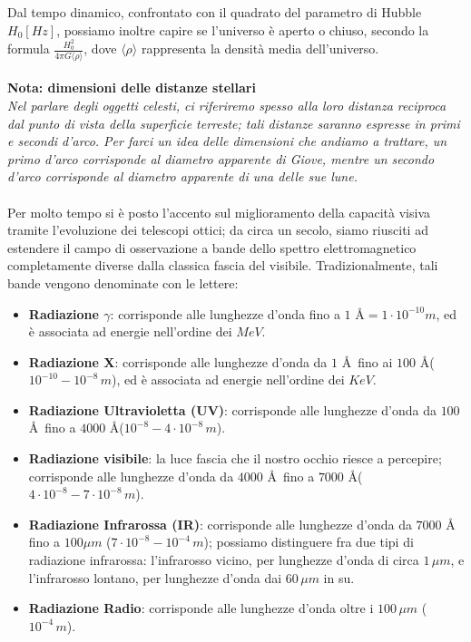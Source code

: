 Dal tempo dinamico, confrontato con il quadrato del parametro di Hubble $H_0 \left[Hz \right]$, possiamo inoltre capire se l'universo è aperto o chiuso, secondo la formula $\frac{H_0 ^2}{4 \pi G \langle \rho \rangle}$, dove $\langle \rho \rangle$ rappresenta la densità media dell'universo.
\\
\\
\textbf{Nota: dimensioni delle distanze stellari}\\
\textit{Nel parlare degli oggetti celesti, ci riferiremo spesso alla loro distanza reciproca dal punto di vista della superficie terreste; tali distanze saranno espresse in primi e secondi d'arco. Per farci un idea delle dimensioni che andiamo a trattare, un primo d'arco corrisponde al diametro apparente di Giove, mentre un secondo d'arco corrisponde al diametro apparente di una delle sue lune.}
\\
\\
Per molto tempo si è posto l'accento sul miglioramento della capacità visiva tramite l'evoluzione dei telescopi ottici; da circa un secolo, siamo riusciti ad estendere il campo di osservazione a bande dello spettro elettromagnetico completamente diverse dalla classica fascia del visibile. Tradizionalmente, tali bande vengono denominate con le lettere:
\begin{itemize}
	\item \textbf{Radiazione $\gamma$}: corrisponde alle lunghezze d'onda fino a $1$ \AA$=1 \cdot 10^{-10} m$, ed è associata ad energie nell'ordine dei $MeV$.
	\item \textbf{Radiazione X}: corrisponde alle lunghezze d'onda da $1$ \AA \, fino ai $100$ \AA ($10^{-10}-10^{-8} \, m$), ed è associata ad energie nell'ordine dei $KeV$.
	\item \textbf{Radiazione Ultravioletta (UV)}: corrisponde alle lunghezze d'onda da $100$ \AA \, fino a $4000$ \AA ($10^{-8}-4 \cdot 10^{-8} \, m$).
	\item \textbf{Radiazione visibile}: la luce fascia che il nostro occhio riesce a percepire; corrisponde alle lunghezze d'onda da $4000$ \AA \, fino a $7000$ \AA ($4 \cdot 10^{-8}-7 \cdot 10^{-8} \, m$).
	\item \textbf{Radiazione Infrarossa (IR)}: corrisponde alle lunghezze d'onda da $7000$ \AA \, fino a $100 \mu m$ ($7 \cdot 10^{-8}-10^{-4} \, m$); possiamo distinguere fra due tipi di radiazione infrarossa: l'infrarosso vicino, per lunghezze d'onda di circa $1 \, \mu m$, e l'infrarosso lontano, per lunghezze d'onda dai $60 \, \mu m$ in su.
	\item \textbf{Radiazione Radio}: corrisponde alle lunghezze d'onda oltre i $100 \, \mu m$ ($10^{-4} \, m$). 
\end{itemize}
